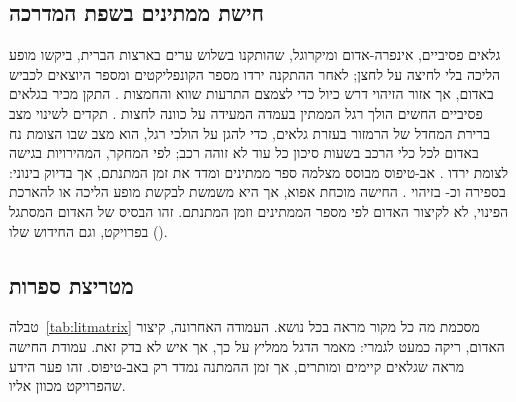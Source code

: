 \subsection{חישת ממתינים בשפת המדרכה}
גלאים פסיביים, אינפרה-אדום ומיקרוגל, שהותקנו בשלוש ערים בארצות הברית, ביקשו מופע הליכה בלי לחיצה על לחצן; לאחר ההתקנה ירדו מספר הקונפליקטים ומספר היוצאים לכביש באדום, אך אזור הזיהוי דרש כיול כדי לצמצם התרעות שווא והחמצות \cite{hughes2000}.
התקן מכיר בגלאים פסיביים החשים הולך רגל הממתין בעמדה המעידה על כוונה לחצות \cite{fhwa2025mutcd}.
תקדים לשינוי מצב ברירת המחדל של הרמזור בעזרת גלאים, כדי להגן על הולכי רגל, הוא מצב שבו הצומת נח באדום לכל כלי הרכב בשעות סיכון כל עוד לא זוהה רכב; לפי המחקר, המהירויות בגישה לצומת ירדו \cite{lenne2007}.
אב-טיפוס מבוסס מצלמה ספר ממתינים ומדד את זמן המתנתם, אך בדיוק בינוני:  בספירה וכ- בזיהוי \cite{wickramasinghe2020}.
החישה מוכחת אפוא, אך היא משמשת לבקשת מופע הליכה או להארכת הפינוי, לא לקיצור האדום לפי מספר הממתינים וזמן המתנתם. זהו הבסיס של האדום המסתגל () בפרויקט, וגם החידוש שלו.

\subsection{מטריצת ספרות}
טבלה~\ref{tab:litmatrix} מסכמת מה כל מקור מראה בכל נושא. העמודה האחרונה, קיצור האדום, ריקה כמעט לגמרי: מאמר הדגל ממליץ על כך, אך איש לא בדק זאת. עמודת החישה מראה שגלאים קיימים ומותרים, אך זמן ההמתנה נמדד רק באב-טיפוס. זהו פער הידע שהפרויקט מכוון אליו.

